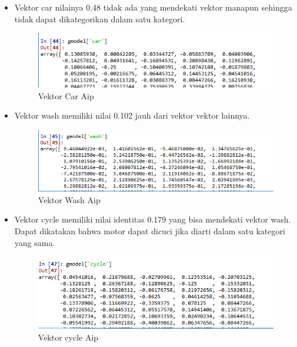 \begin{itemize}
\item Vektor car nilainya 0.48 tidak ada yang mendekati vektor manapun sehingga tidak dapat dikategorikan dalam satu kategori.
\begin{figure}[!hbtp]
\centering
\includegraphics[scale=0.3]{figures/AIP/e11.PNG}
\caption{Vektor Car Aip}
\label{Praktek}
\end{figure}


\item Vektor wash memiliki nilai 0.102 jauh dari vektor vektor lainnya.
\begin{figure}[!hbtp]
\centering
\includegraphics[scale=0.3]{figures/AIP/e12.PNG}
\caption{Vektor Wash Aip}
\label{Praktek}
\end{figure}


\item Vektor cycle memiliki nilai identitas 0.179 yang bisa mendekati vektor wash. Dapat dikatakan bahwa motor dapat dicuci jika diarti dalam satu kategori yang sama.
\begin{figure}[!hbtp]
\centering
\includegraphics[scale=0.3]{figures/AIP/e14.PNG}
\caption{Vektor cycle Aip}
\label{Praktek}
\end{figure}
\end{itemize}

